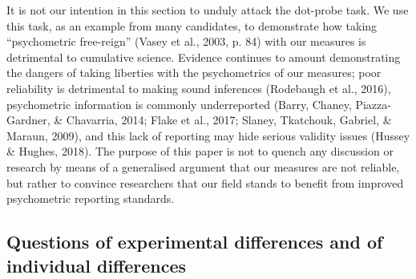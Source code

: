 \documentclass[english,,man,floatsintext]{apa6}
\begin{document}
It is not our intention in this section to unduly attack the dot-probe task. We use this task, as an example from many candidates, to demonstrate how taking \enquote{psychometric free-reign} (Vasey et al., 2003, p. 84) with our measures is detrimental to cumulative science. Evidence continues to amount demonstrating the dangers of taking liberties with the psychometrics of our measures; poor reliability is detrimental to making sound inferences (Rodebaugh et al., 2016), psychometric information is commonly underreported (Barry, Chaney, Piazza-Gardner, \& Chavarria, 2014; Flake et al., 2017; Slaney, Tkatchouk, Gabriel, \& Maraun, 2009), and this lack of reporting may hide serious validity issues (Hussey \& Hughes, 2018). The purpose of this paper is not to quench any discussion or research by means of a generalised argument that our measures are not reliable, but rather to convince researchers that our field stands to benefit from improved psychometric reporting standards.

\hypertarget{questions-of-experimental-differences-and-of-individual-differences}{%
\subsection{Questions of experimental differences and of individual differences}\label{questions-of-experimental-differences-and-of-individual-differences}}
\end{document}
